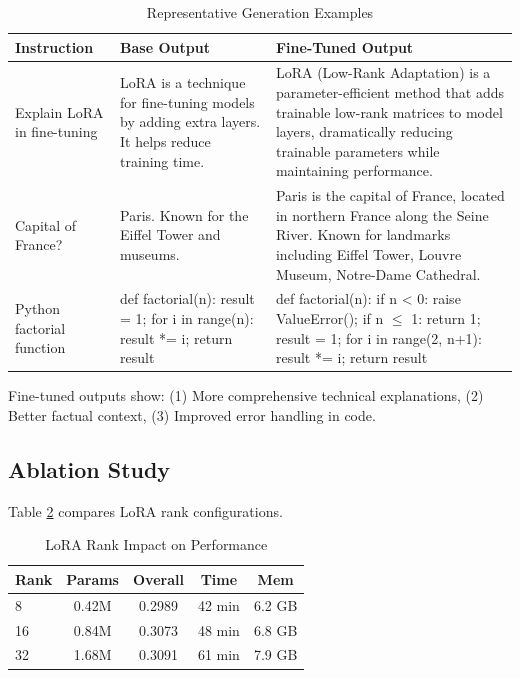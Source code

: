 \documentclass[conference]{IEEEtran}
\begin{document}
\begin{table}[htbp]
\caption{Representative Generation Examples}
\begin{center}
\small
\begin{tabular}{p{}p{}p{}}
\toprule
\textbf{Instruction} & \textbf{Base Output} & \textbf{Fine-Tuned Output} \\
\midrule
Explain LoRA in fine-tuning & 
LoRA is a technique for fine-tuning models by adding extra layers. It helps reduce training time. & 
LoRA (Low-Rank Adaptation) is a parameter-efficient method that adds trainable low-rank matrices to model layers, dramatically reducing trainable parameters while maintaining performance. \\
\midrule
Capital of France? & 
Paris. Known for the Eiffel Tower and museums. & 
Paris is the capital of France, located in northern France along the Seine River. Known for landmarks including Eiffel Tower, Louvre Museum, Notre-Dame Cathedral. \\
\midrule
Python factorial function & 
def factorial(n): result = 1; for i in range(n): result *= i; return result & 
def factorial(n): if n < 0: raise ValueError(); if n $\leq$ 1: return 1; result = 1; for i in range(2, n+1): result *= i; return result \\
\bottomrule
\end{tabular}
\label{tab:examples}
\end{center}
\end{table}

Fine-tuned outputs show: (1) More comprehensive technical explanations, (2) Better factual context, (3) Improved error handling in code.

\subsection{Ablation Study}

Table \ref{tab:ablation_rank} compares LoRA rank configurations.

\begin{table}[htbp]
\caption{LoRA Rank Impact on Performance}
\begin{center}
\begin{tabular}{lcccc}
\toprule
\textbf{Rank} & \textbf{Params} & \textbf{Overall} & \textbf{Time} & \textbf{Mem} \\
\midrule
8 & 0.42M & 0.2989 & 42 min & 6.2 GB \\
16 & 0.84M & 0.3073 & 48 min & 6.8 GB \\
32 & 1.68M & 0.3091 & 61 min & 7.9 GB \\
\bottomrule
\end{tabular}
\label{tab:ablation_rank}
\end{center}
\end{table}
\end{document}
